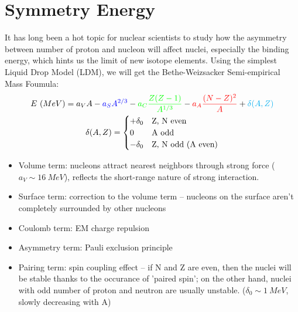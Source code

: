 \section{Symmetry Energy} 
It has long been a hot topic for nuclear scientists to study how the asymmetry 
between number of proton and nucleon will affect nuclei, especially the binding
energy, which hints us the limit of new isotope elements. Using the simplest 
Liquid Drop Model (LDM), we will get the Bethe-Weizsacker Semi-empirical Mass Foumula:
\begin{equation}
    \label{eq:mass-foumula}
    \begin{gathered}
	E\ (MeV) = \textcolor{black}{a_V A} 
	    - \textcolor{blue}{a_S A^{2/3}} 
	    - \textcolor{green}{a_C\frac{Z(Z-1)}{A^{1/3}}} 
	    - \textcolor{red}{a_A\frac{(N-Z)^2}{A}} 
	    + \textcolor{cyan}{\delta(A, Z)} \\
	\delta(A, Z) = 
	    \begin{cases}
		+\delta_0	& \text{Z, N even} \\
		0		& \text{A odd}	\\
		-\delta_0	& \text{Z, N odd (A even)} \\
	    \end{cases}
    \end{gathered}
\end{equation}

\begin{itemize}
    \color{black} \item Volume term: nucleons attract nearest neighbors 
	through strong force ($a_V \sim 16\ MeV$), reflects the short-range
	nature of strong interaction.
    \color{blue}  \item Surface term: correction to the volume term -- nucleons 
	on the surface aren't completely surrounded by other nucleons
    \color{green} \item Coulomb term: EM charge repulsion
    \color{red}   \item Asymmetry term: Pauli exclusion principle
    \color{cyan}  \item Pairing term: spin coupling effect -- if N and Z are even,
	then the nuclei will be stable thanks to the occurance of 'paired spin';
	on the other hand, nuclei with odd number of proton and neutron are usually
	unstable. ($\delta_0 \sim 1\ MeV$, slowly decreasing with A)
\end{itemize}

